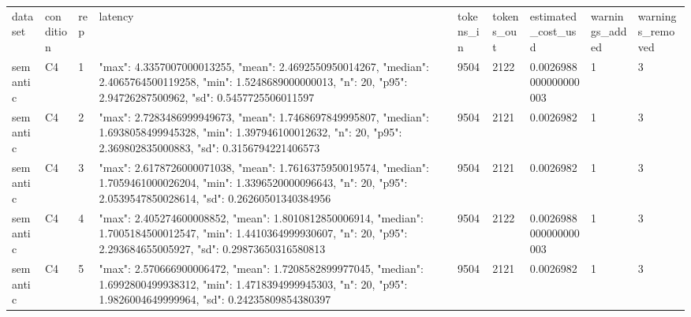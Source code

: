 \begin{tabular}{lllllllll}
dataset & condition & rep & latency & tokens\_in & tokens\_out & estimated\_cost\_usd & warnings\_added & warnings\_removed \\
semantic & C4 & 1 & {"max": 4.3357007000013255, "mean": 2.4692550950014267, "median": 2.4065764500119258, "min": 1.5248689000000013, "n": 20, "p95": 2.94726287500962, "sd": 0.5457725506011597} & 9504 & 2122 & 0.0026988000000000003 & 1 & 3 \\
semantic & C4 & 2 & {"max": 2.7283486999949673, "mean": 1.7468697849995807, "median": 1.6938058499945328, "min": 1.397946100012632, "n": 20, "p95": 2.369802835000883, "sd": 0.3156794221406573} & 9504 & 2121 & 0.0026982 & 1 & 3 \\
semantic & C4 & 3 & {"max": 2.6178726000071038, "mean": 1.7616375950019574, "median": 1.7059461000026204, "min": 1.3396520000096643, "n": 20, "p95": 2.0539547850028614, "sd": 0.26260501340384956} & 9504 & 2121 & 0.0026982 & 1 & 3 \\
semantic & C4 & 4 & {"max": 2.405274600008852, "mean": 1.8010812850006914, "median": 1.7005184500012547, "min": 1.4410364999930607, "n": 20, "p95": 2.293684655005927, "sd": 0.29873650316580813} & 9504 & 2122 & 0.0026988000000000003 & 1 & 3 \\
semantic & C4 & 5 & {"max": 2.570666900006472, "mean": 1.7208582899977045, "median": 1.6992800499938312, "min": 1.4718394999945303, "n": 20, "p95": 1.9826004649999964, "sd": 0.24235809854380397} & 9504 & 2121 & 0.0026982 & 1 & 3 \\
\end{tabular}